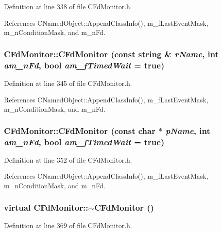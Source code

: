 Definition at line 338 of file CFd\-Monitor.h.

References CNamed\-Object::Append\-Class\-Info(), m\_\-f\-Last\-Event\-Mask, m\_\-n\-Condition\-Mask, and m\_\-n\-Fd.
\subsubsection{\setlength{\rightskip}{0pt plus 5cm}CFd\-Monitor::CFd\-Monitor (const string \& {\em r\-Name}, int {\em am\_\-n\-Fd}, bool {\em am\_\-f\-Timed\-Wait} = true)\hspace{0.3cm}{\tt  [inline]}}\label{classCFdMonitor_a1}




Definition at line 345 of file CFd\-Monitor.h.

References CNamed\-Object::Append\-Class\-Info(), m\_\-f\-Last\-Event\-Mask, m\_\-n\-Condition\-Mask, and m\_\-n\-Fd.
\subsubsection{\setlength{\rightskip}{0pt plus 5cm}CFd\-Monitor::CFd\-Monitor (const char $\ast$ {\em p\-Name}, int {\em am\_\-n\-Fd}, bool {\em am\_\-f\-Timed\-Wait} = true)\hspace{0.3cm}{\tt  [inline]}}\label{classCFdMonitor_a2}




Definition at line 352 of file CFd\-Monitor.h.

References CNamed\-Object::Append\-Class\-Info(), m\_\-f\-Last\-Event\-Mask, m\_\-n\-Condition\-Mask, and m\_\-n\-Fd.
\subsubsection{\setlength{\rightskip}{0pt plus 5cm}virtual CFd\-Monitor::$\sim$CFd\-Monitor ()\hspace{0.3cm}{\tt  [inline, virtual]}}\label{classCFdMonitor_a4}




Definition at line 369 of file CFd\-Monitor.h.
